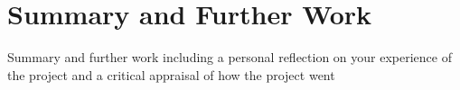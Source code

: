 \section{Summary and Further Work}
{\color{red}Summary and further work including a personal reflection on your experience of the project and a critical appraisal of how the project went}